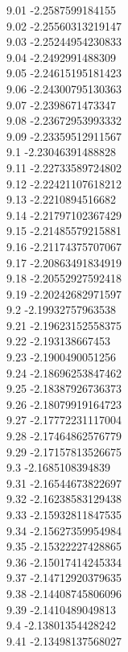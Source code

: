 {9.01	-2.2587599184155\\
9.02	-2.25560313219147\\
9.03	-2.25244954230833\\
9.04	-2.2492991488309\\
9.05	-2.24615195181423\\
9.06	-2.24300795130363\\
9.07	-2.2398671473347\\
9.08	-2.23672953993332\\
9.09	-2.23359512911567\\
9.1	-2.23046391488828\\
9.11	-2.22733589724802\\
9.12	-2.22421107618212\\
9.13	-2.2210894516682\\
9.14	-2.21797102367429\\
9.15	-2.21485579215881\\
9.16	-2.21174375707067\\
9.17	-2.20863491834919\\
9.18	-2.20552927592418\\
9.19	-2.20242682971597\\
9.2	-2.19932757963538\\
9.21	-2.19623152558375\\
9.22	-2.193138667453\\
9.23	-2.1900490051256\\
9.24	-2.18696253847462\\
9.25	-2.18387926736373\\
9.26	-2.18079919164723\\
9.27	-2.17772231117004\\
9.28	-2.17464862576779\\
9.29	-2.17157813526675\\
9.3	-2.1685108394839\\
9.31	-2.16544673822697\\
9.32	-2.16238583129438\\
9.33	-2.15932811847535\\
9.34	-2.15627359954984\\
9.35	-2.15322227428865\\
9.36	-2.15017414245334\\
9.37	-2.14712920379635\\
9.38	-2.14408745806096\\
9.39	-2.1410489049813\\
9.4	-2.13801354428242\\
9.41	-2.13498137568027\\
}
